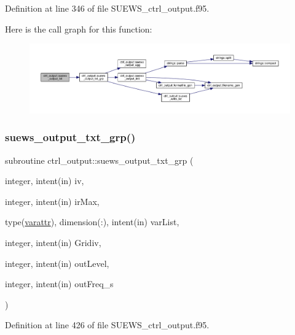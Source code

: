 Definition at line 346 of file S\+U\+E\+W\+S\+\_\+ctrl\+\_\+output.\+f95.

Here is the call graph for this function\+:\nopagebreak
\begin{figure}[H]
\begin{center}
\leavevmode
\includegraphics[width=350pt]{namespacectrl__output_a33e3b788edad27be3211458c4388f8e5_cgraph}
\end{center}
\end{figure}
\mbox{\label{namespacectrl__output_ac3541cbdb88f9028bc3592ee65b64980}} 
\subsubsection{\texorpdfstring{suews\+\_\+output\+\_\+txt\+\_\+grp()}{suews\_output\_txt\_grp()}}
{\footnotesize\ttfamily subroutine ctrl\+\_\+output\+::suews\+\_\+output\+\_\+txt\+\_\+grp (\begin{DoxyParamCaption}\item[{integer, intent(in)}]{iv,  }\item[{integer, intent(in)}]{ir\+Max,  }\item[{type(\hyperlink{structctrl__output_1_1varattr}{varattr}), dimension(\+:), intent(in)}]{var\+List,  }\item[{integer, intent(in)}]{Gridiv,  }\item[{integer, intent(in)}]{out\+Level,  }\item[{integer, intent(in)}]{out\+Freq\+\_\+s }\end{DoxyParamCaption})}



Definition at line 426 of file S\+U\+E\+W\+S\+\_\+ctrl\+\_\+output.\+f95.

